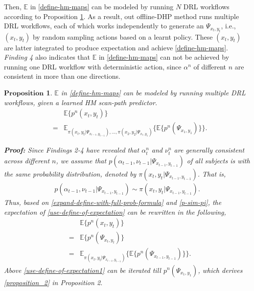 \documentclass[10pt,journal,compsoc]{IEEEtran}
\newtheorem{proposition}[theorem]{$\textbf{Proposition}$}
\begin{document}
Then, $\mathbb{E}$ in \eqref{define-hm-maps} can be modeled by running $N$ DRL workflows according to Proposition \ref{lemma2}. As a result, out offline-DHP method runs multiple DRL workflows, each of which works independently to generate an $\Psi_{ x_{t}, y_{t} }$, i.e., $(x_{t}, y_{t})$ by random sampling actions based on a learnt policy.
These $(x_{t}, y_{t})$ are latter integrated to produce expectation and achieve \eqref{define-hm-maps}.
\textit{Finding 4} also indicates that $\mathbb{E}$ in \eqref{define-hm-maps} can not be achieved by running one DRL workflow with deterministic action, since $\alpha^n$ of different $n$ are consistent in more than one directions.

\begin{proposition}
    \label{lemma2}
      $\mathbb{E}$ in \eqref{define-hm-maps} can be modeled by running multiple DRL workflows, given a learned HM scan-path predictor.
        \begin{eqnarray}
        \label{proposition_2}
        && \mathbb{E}\{ p^n(x_t, y_t) \} \nonumber\\
        &=& \mathbb{E}_{\pi(x_{t},y_{t} |\Psi_{ x_{t-1}, y_{t-1} } ),...,\pi(x_{2},y_{2} |\Psi_{ x_{1}, y_{1} } )} \{ \mathbb{E} \{ p^n( \Psi_{ x_{1}, y_{1} } ) \} \}.
        \end{eqnarray}

    \textbf{Proof:}
        Since \textit{Findings 2-4} have revealed that $\alpha^n_t$ and $\nu^n_t$ are generally consistent across different $n$, we assume that $p(\alpha_{t-1}, \nu_{t-1} | \Psi_{ x_{t-1}, y_{t-1} } )$ of all subjects is with the same probability distribution, denoted by $\pi(x_{t},y_{t}|\Psi_{x_{t-1}, y_{t-1} } )$. That is,
        \begin{eqnarray}
        \label{p-sim-pi}
        p( \alpha_{t-1}, \nu_{t-1} | \Psi_{ x_{t-1}, y_{t-1} } ) \sim \pi(x_{t},y_{t} | \Psi_{ x_{t-1}, y_{t-1} } ).
        \end{eqnarray}
        Thus, based on \eqref{expand-define-with-full-prob-formula} and \eqref{p-sim-pi}, the expectation of \eqref{use-define-of-expectation} can be rewritten in the following,
        \begin{eqnarray}
        \label{use-define-of-expectation1}
        && \mathbb{E}\{ p^n(x_t, y_t) \} \nonumber\\
        \nonumber &=& \mathbb{E}\{ p^n(\Psi_{ x_t, y_t }) \} \nonumber\\
        &=& \mathbb{E}_{\pi(x_{t},y_{t} |\Psi_{ x_{t-1}, y_{t-1} } ) } \{ \mathbb{E} \{ p^n( \Psi_{ x_{t-1}, y_{t-1} } ) \} \}.
        \end{eqnarray}
         Above \eqref{use-define-of-expectation1} can be iterated till $p^n( \Psi_{ x_{1}, y_{1} } )$, which derives \eqref{proposition_2} in Proposition 2.

\end{proposition}
\end{document}
